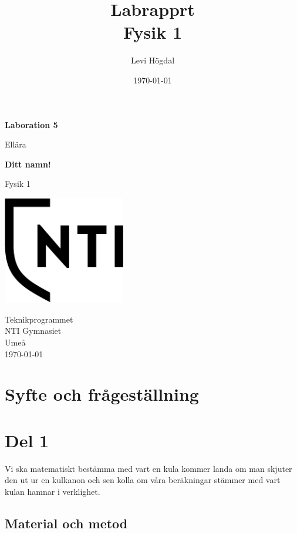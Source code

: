 \documentclass[11p]{article}
\title{Labrapprt \\ \small Fysik 1}
\author{Levi Högdal }
\date{\today}
\begin{document}
    \begin{titlepage}
        \begin{center}
            \vspace*{1cm}

            \Huge
            \textbf{Laboration 5}

            \vspace{0.5cm}
            \LARGE
            Ellära

            \vspace{1.5cm}

            \textbf{Ditt namn!}

            \vfill


            Fysik 1

            \vspace{0.8cm}

            \includegraphics[width=0.4\textwidth]{../images/NTI Gymnasiet_Symbol_print_svart.png}

            \Large
            Teknikprogrammet\\
            NTI Gymnasiet\\
            Umeå\\
            \today

        \end{center}
    \end{titlepage}
    \section{Syfte och frågeställning}
    \section{Del 1}
    Vi ska matematiskt bestämma med vart en kula kommer landa om man skjuter den ut ur en kulkanon och sen kolla om våra beräkningar stämmer med vart kulan hamnar i verklighet.
    \subsection{Material och metod}
\end{document}
